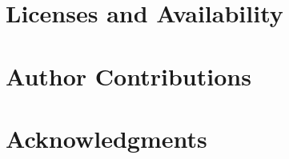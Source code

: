 \documentclass[letterpaper]{article}       %
\newcommand{\camerareadyonly}[1]{\ifcameraready #1\fi}
\begin{document}
\section{Licenses and Availability}


\camerareadyonly{%
\section{Author Contributions}

\section{Acknowledgments}

}


\end{document}

